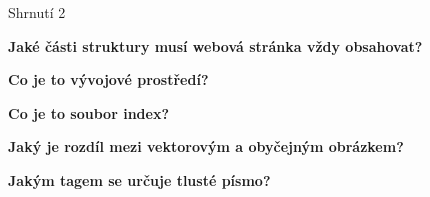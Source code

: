 \documentclass[aspectratio=1610]{beamer}
\begin{document}
\begin{frame}{Shrnutí 2}
    \begin{cardTiny}
        \begin{center}
            \textbf{Jaké části struktury musí webová stránka vždy obsahovat?}
        \end{center}
    \end{cardTiny}
    \begin{cardTiny}
        \begin{center}
            \textbf{Co je to vývojové prostředí?}
        \end{center}
    \end{cardTiny}
    \begin{cardTiny}
        \begin{center}
            \textbf{Co je to soubor index?}
        \end{center}
    \end{cardTiny}
    \begin{cardTiny}
        \begin{center}
            \textbf{Jaký je rozdíl mezi vektorovým a obyčejným obrázkem?}
        \end{center}
    \end{cardTiny}
    \begin{cardTiny}
        \begin{center}
            \textbf{Jakým tagem se určuje tlusté písmo?}
        \end{center}
    \end{cardTiny}
\end{frame}
\end{document}

